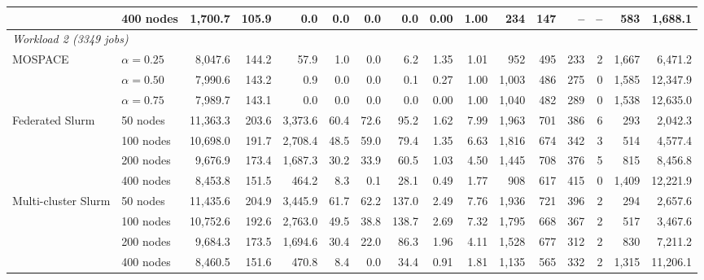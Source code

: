 \documentclass[conference]{IEEEtran}
\begin{document}
\begin{table}[htbp]
{\begin{tabular}{llrrrrrrrrrrrrrr}
 & 400 nodes & 1{,}700.7 & 105.9 & 0.0 & 0.0 & 0.0 & 0.0 & 0.00 & 1.00 & 234 & 147 & -- & -- & 583 & 1{,}688.1 \\
\hline
\multicolumn{16}{l}{\textit{Workload 2 (3349 jobs)}} \\
MOSPACE & $\alpha=0.25$ & 8{,}047.6 & 144.2 & 57.9 & 1.0 & 0.0 & 6.2 & 1.35 & 1.01 & 952 & 495 & 233 & 2 & 1{,}667 & 6{,}471.2 \\
 & $\alpha=0.50$ & 7{,}990.6 & 143.2 & 0.9 & 0.0 & 0.0 & 0.1 & 0.27 & 1.00 & 1{,}003 & 486 & 275 & 0 & 1{,}585 & 12{,}347.9 \\
 & $\alpha=0.75$ & 7{,}989.7 & 143.1 & 0.0 & 0.0 & 0.0 & 0.0 & 0.00 & 1.00 & 1{,}040 & 482 & 289 & 0 & 1{,}538 & 12{,}635.0 \\
\cline{2-16}
Federated Slurm & 50 nodes & 11{,}363.3 & 203.6 & 3{,}373.6 & 60.4 & 72.6 & 95.2 & 1.62 & 7.99 & 1{,}963 & 701 & 386 & 6 & 293 & 2{,}042.3 \\
 & 100 nodes & 10{,}698.0 & 191.7 & 2{,}708.4 & 48.5 & 59.0 & 79.4 & 1.35 & 6.63 & 1{,}816 & 674 & 342 & 3 & 514 & 4{,}577.4 \\
 & 200 nodes & 9{,}676.9 & 173.4 & 1{,}687.3 & 30.2 & 33.9 & 60.5 & 1.03 & 4.50 & 1{,}445 & 708 & 376 & 5 & 815 & 8{,}456.8 \\
 & 400 nodes & 8{,}453.8 & 151.5 & 464.2 & 8.3 & 0.1 & 28.1 & 0.49 & 1.77 & 908 & 617 & 415 & 0 & 1{,}409 & 12{,}221.9 \\
\cline{2-16}
Multi-cluster Slurm & 50 nodes & 11{,}435.6 & 204.9 & 3{,}445.9 & 61.7 & 62.2 & 137.0 & 2.49 & 7.76 & 1{,}936 & 721 & 396 & 2 & 294 & 2{,}657.6 \\
 & 100 nodes & 10{,}752.6 & 192.6 & 2{,}763.0 & 49.5 & 38.8 & 138.7 & 2.69 & 7.32 & 1{,}795 & 668 & 367 & 2 & 517 & 3{,}467.6 \\
 & 200 nodes & 9{,}684.3 & 173.5 & 1{,}694.6 & 30.4 & 22.0 & 86.3 & 1.96 & 4.11 & 1{,}528 & 677 & 312 & 2 & 830 & 7{,}211.2 \\
 & 400 nodes & 8{,}460.5 & 151.6 & 470.8 & 8.4 & 0.0 & 34.4 & 0.91 & 1.81 & 1{,}135 & 565 & 332 & 2 & 1{,}315 & 11{,}206.1 \\
\hline
\end{tabular}%
}
\end{table}







\end{document}
